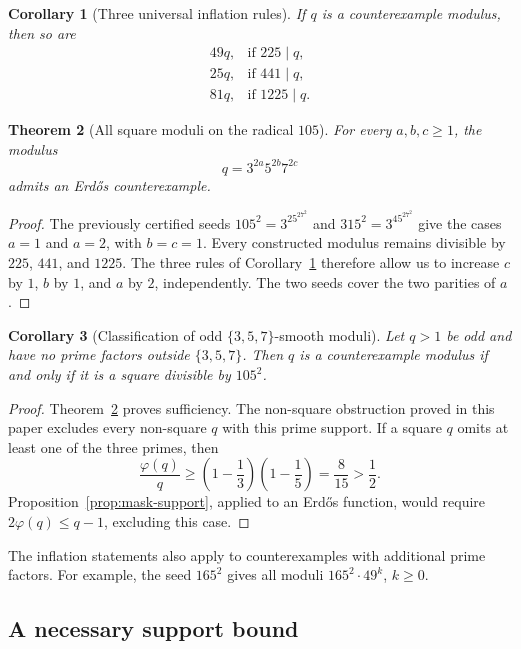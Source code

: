\documentclass[11pt]{amsart}
\newtheorem{theorem}{Theorem}[section]
\newtheorem{corollary}[theorem]{Corollary}
\theoremstyle{definition}
\theoremstyle{remark}
\numberwithin{equation}{section}
\begin{document}
\begin{corollary}[Three universal inflation rules]
\label{cor:inflation-rules}
If $q$ is a counterexample modulus, then so are
\[
 \begin{array}{ll}
 49q,&\text{if }225\mid q,\\
 25q,&\text{if }441\mid q,\\
 81q,&\text{if }1225\mid q.
 \end{array}
\]
\end{corollary}

\begin{theorem}[All square moduli on the radical $105$]
\label{thm:all-357-squares}
For every $a,b,c\ge1$, the modulus
\[
 q=3^{2a}5^{2b}7^{2c}
\]
admits an Erd\H{o}s counterexample.
\end{theorem}

\begin{proof}
The previously certified seeds $105^2=3^25^27^2$ and
$315^2=3^45^27^2$ give the cases $a=1$ and $a=2$, with $b=c=1$.
Every constructed modulus remains divisible by $225$, $441$, and $1225$.
The three rules of Corollary~\ref{cor:inflation-rules} therefore allow us
to increase $c$ by $1$, $b$ by $1$, and $a$ by $2$, independently.
The two seeds cover the two parities of $a$.
\end{proof}

\begin{corollary}[Classification of odd $\{3,5,7\}$-smooth moduli]
\label{cor:357-classification}
Let $q>1$ be odd and have no prime factors outside $\{3,5,7\}$. Then $q$
is a counterexample modulus if and only if it is a square divisible by
$105^2$.
\end{corollary}

\begin{proof}
Theorem~\ref{thm:all-357-squares} proves sufficiency. The non-square
obstruction proved in this paper excludes every non-square $q$ with this
prime support. If a square $q$ omits at least one of the three primes, then
\[
 \frac{\varphi(q)}q\ge
 \left(1-\frac13\right)\left(1-\frac15\right)
 =\frac8{15}>\frac12.
\]
Proposition~\ref{prop:mask-support}, applied to an Erd\H{o}s function,
would require $2\varphi(q)\le q-1$, excluding this case.
\end{proof}

The inflation statements also apply to counterexamples with additional
prime factors. For example, the seed $165^2$ gives all moduli
$165^2\cdot49^k$, $k\ge0$.

\subsection{A necessary support bound}
\end{document}
